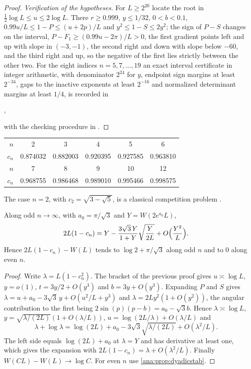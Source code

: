 \begin{proof}
\emph{Verification of the hypotheses.} For $L\ge2^{20}$ locate the root in
$\frac12\log L\le u\le2\log L$. There $r\ge0.999$, $y\le1/32$, $0<b<0.1$,
$0.99u/L\le1-P\le(u+2p)/L$ and $y^2\le1-S\le2y^2$; the sign of $P-S$ changes on the interval,
$P-F_1\ge(0.99u-2\pi)/L>0$, the first gradient points left and up with slope in $(-3,-1)$,
the second right and down with slope below $-60$, and the third right and up, so the
negative of the first lies strictly between the other two. For the eight indices
$n=5,7,\dots,19$ an exact interval certificate in integer arithmetic, with denominator
$2^{24}$ for $y$, endpoint sign margins at least $2^{-34}$, gaps to the inactive exponents
at least $2^{-16}$ and normalized determinant margins at least $1/4$, is recorded in
\begin{center}
,
\end{center}
with the checking procedure in .
\end{proof}

\begin{center}\small
\begin{tabular}{rccccc}
\toprule
$n$&2&3&4&5&6\\
$c_n$&0.874032&0.882003&0.920395&0.927585&0.963810\\
\midrule
$n$&7&8&9&10&12\\
$c_n$&0.968755&0.986468&0.989010&0.995466&0.998575\\
\bottomrule
\end{tabular}
\end{center}
The case $n=2$, with $c_2=\sqrt{3-\sqrt5}$, is a classical competition problem
\cite[\S3.3, Problem~2]{Szasz1968Contests}.

\begin{theorem}\label{ana:thm:dyadicparity}
Along odd $n\to\infty$, with $a_0=\pi/\sqrt3$ and $Y=W(2e^{a_0}L)$,
\[
 2L(1-c_n)=Y-\frac{3\sqrt3\,Y}{1+Y}\sqrt{\frac Y{2L}}+O\Bigl(\frac{Y^2}L\Bigr).
\]
Hence $2L(1-c_n)-W(L)$ tends to $\log2+\pi/\sqrt3$ along odd $n$ and to $0$ along even $n$.
\end{theorem}

\begin{proof}
Write $\lambda=L(1-c_n^2)$. The bracket of the previous proof gives $u\asymp\log L$, $y=o(1)$,
$t=3y/2+O(y^3)$ and $b=3y+O(y^3)$. Expanding $P$ and $S$ gives
$\lambda=u+a_0-3\sqrt3\,y+O(u^2/L+y^3)$ and $\lambda=2Ly^2(1+O(y^2))$, the angular
contribution to the first being $2\sin(p)(p-b)=a_0-\sqrt3b$. Hence $\lambda\asymp\log L$,
$y=\sqrt{\lambda/(2L)}(1+O(\lambda/L))$, $u=\log(2L/\lambda)+O(\lambda/L)$ and
\[
 \lambda+\log\lambda=\log(2L)+a_0-3\sqrt3\sqrt{\lambda/(2L)}+O(\lambda^2/L).
\]
The left side equals $\log(2L)+a_0$ at $\lambda=Y$ and has derivative at least one, which
gives the expansion with $2L(1-c_n)=\lambda+O(\lambda^2/L)$. Finally $W(CL)-W(L)\to\log C$.
For even $n$ use \cref{ana:prop:dyadicstab}.
\end{proof}

